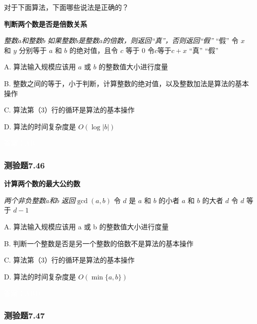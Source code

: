 \documentclass[UTF8, heading=true]{ctexart}
\begin{document}
对于下面算法，下面哪些说法是正确的？

\begin{algorithm}
  \caption{\textbf{判断两个数是否是倍数关系}}
  \begin{algorithmic}[1]
      \Require \textit{整数$a$和整数$b$}
      \Ensure \textit{如果整数$b$是整数$a$的倍数，则返回“真”，否则返回“假”}
       \Return “假” 
      \EndIf
      \State 令 $x$ 和 $y$ 分别等于 $a$ 和 $b$ 的绝对值，且令 $c$ 等于 0\;
       令$c$等于$c+x$
      \EndWhile
       \Return “真”
      \Else 
      \State \Return “假”\;
      \EndIf
  \end{algorithmic}
\end{algorithm}

A. 算法输入规模应该用 $a$ 或 $b$ 的整数值大小进行度量

B. 整数之间的等于，小于判断，计算整数的绝对值，以及整数加法是算法的基本操作

C. 算法第（3）行的循环是算法的基本操作

D.  算法的时间复杂度是 $O(\log |b|)$

\textcolor{white}{答案：AB}

\subsubsection{测验题7.46}

\begin{algorithm}
  \caption{\textbf{计算两个数的最大公约数}}
  \begin{algorithmic}[1]
      \Require \textit{两个非负整数$a$和$b$}
      \Ensure \textit{返回$\operatorname{gcd}(a, b)$}
      \State 令 $d$ 是 $a$ 和 $b$ 的小者
          \State \Return $a$ 和 $b$ 的大者
      \EndIf
              \State \Return $d$
          \EndIf
          \State 令 $d$ 等于 $d - 1$
      \EndWhile
  \end{algorithmic}
\end{algorithm}

A. 算法输入规模应该用 a 或 b 的整数值大小进行度量

B. 
判断一个整数是否是另一个整数的倍数不是算法的基本操作

C. 
算法第（3）行的循环是算法的基本操作

D.  
算法的时间复杂度是 $O(\min \{a, b\})$

\textcolor{white}{答案：ABD}

\subsubsection{测验题7.47}
\end{document}
